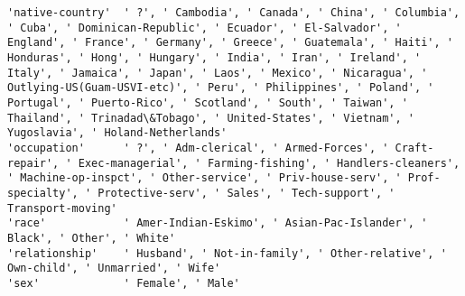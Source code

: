 \documentclass[11pt]{article}
\begin{document}
\begin{Verbatim}[commandchars=\\\{\}]
'native-country'  ' ?', ' Cambodia', ' Canada', ' China', ' Columbia', ' Cuba', ' Dominican-Republic', ' Ecuador', ' El-Salvador', ' England', ' France', ' Germany', ' Greece', ' Guatemala', ' Haiti', ' Honduras', ' Hong', ' Hungary', ' India', ' Iran', ' Ireland', ' Italy', ' Jamaica', ' Japan', ' Laos', ' Mexico', ' Nicaragua', ' Outlying-US(Guam-USVI-etc)', ' Peru', ' Philippines', ' Poland', ' Portugal', ' Puerto-Rico', ' Scotland', ' South', ' Taiwan', ' Thailand', ' Trinadad\&Tobago', ' United-States', ' Vietnam', ' Yugoslavia', ' Holand-Netherlands'
'occupation'      ' ?', ' Adm-clerical', ' Armed-Forces', ' Craft-repair', ' Exec-managerial', ' Farming-fishing', ' Handlers-cleaners', ' Machine-op-inspct', ' Other-service', ' Priv-house-serv', ' Prof-specialty', ' Protective-serv', ' Sales', ' Tech-support', ' Transport-moving'                                                                                                                                                                                                                                                                                       
'race'            ' Amer-Indian-Eskimo', ' Asian-Pac-Islander', ' Black', ' Other', ' White'                                                                                                                                                                                                                                                                                                                                                                                                                                                                                     
'relationship'    ' Husband', ' Not-in-family', ' Other-relative', ' Own-child', ' Unmarried', ' Wife'                                                                                                                                                                                                                                                                                                                                                                                                                                                                           
'sex'             ' Female', ' Male'                                                                                                                                                                                                                                                                                                                                                                                                                                                                                                                                             

\end{Verbatim}
\end{document}
